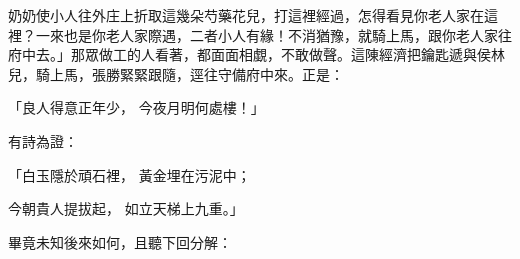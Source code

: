 奶奶使小人往外庄上折取這幾朵芍藥花兒，打這裡經過，怎得看見你老人家在這裡？一來也是你老人家際遇，二者小人有緣！不消猶豫，就騎上馬，跟你老人家往府中去。」那眾做工的人看著，都面面相覷，不敢做聲。這陳經濟把鑰匙遞與侯林兒，騎上馬，張勝緊緊跟隨，逕往守備府中來。正是：

「良人得意正年少，  今夜月明何處樓！」

有詩為證：

「白玉隱於頑石裡，  黃金埋在污泥中；

今朝貴人提拔起，  如立天梯上九重。」

畢竟未知後來如何，且聽下回分解：

